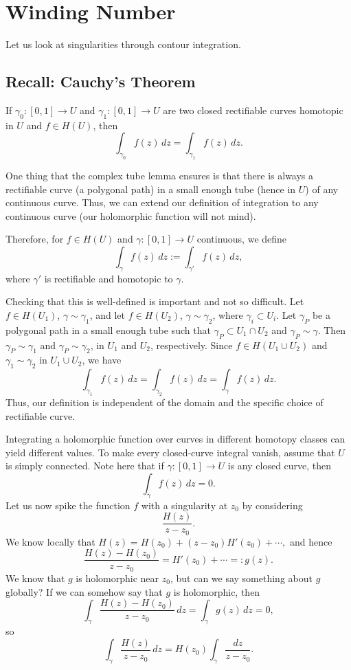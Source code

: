 \documentclass[11pt,a4paper]{article}
\begin{document}
\section*{Winding Number}
Let us look at singularities through contour integration.

\subsection*{Recall: Cauchy's Theorem}
If \(\gamma_0:[0,1]\to U\) and \(\gamma_1:[0,1]\to U\) are two closed rectifiable curves homotopic in $U$ and \(f\in H(U)\), then
\[
  \int_{\gamma_0} f(z)\,dz=\int_{\gamma_1} f(z)\,dz.
\]

One thing that the complex tube lemma ensures is that there is always a rectifiable curve (a polygonal path) in a small enough tube (hence in \(U\)) of any continuous curve. Thus, we can extend our definition of integration to any continuous curve (our holomorphic function will not mind).


Therefore, for \(f\in H(U)\) and \(\gamma:[0,1]\to U\) continuous, we define
\[
  \int_\gamma f(z)\,dz:=\int_{\gamma'} f(z)\,dz,
\]
where \(\gamma'\) is rectifiable and homotopic to \(\gamma\).

Checking that this is well-defined is important and not so difficult. Let \(f\in H(U_1)\), \(\gamma\sim\gamma_1\), and let \(f\in H(U_2)\), \(\gamma\sim\gamma_2\), where \(\gamma_i\subset U_i\). Let \(\gamma_P\) be a polygonal path in a small enough tube such that \(\gamma_P\subset U_1\cap U_2\) and \(\gamma_P\sim\gamma\). Then \(\gamma_P\sim\gamma_1\) and \(\gamma_P\sim\gamma_2\), in \(U_1\) and \(U_2\), respectively. Since \(f\in H(U_1\cup U_2)\) and \(\gamma_1\sim\gamma_2\) in \(U_1\cup U_2\), we have
\[
  \int_{\gamma_1} f(z)\,dz
  =\int_{\gamma_2} f(z)\,dz
  =\int_\gamma f(z)\,dz.
\]
Thus, our definition is independent of the domain and the specific choice of rectifiable curve.

Integrating a holomorphic function over curves in different homotopy classes can yield different values. To make every closed-curve integral vanish, assume that \(U\) is simply connected. Note here that if \(\gamma:[0,1]\to U\) is any closed curve, then
\[
  \int_\gamma f(z)\,dz=0.
\]
Let us now spike the function \(f\) with a singularity at \(z_0\) by considering
\[
  \frac{H(z)}{z-z_0}.
\]
We know locally that \(H(z)=H(z_0)+(z-z_0)H'(z_0)+\cdots,\)
and hence
\[
  \frac{H(z)-H(z_0)}{z-z_0}=H'(z_0)+\cdots=:g(z).
\]
We know that \(g\) is holomorphic near \(z_0\), but can we say something about \(g\) globally? If we can somehow say that \(g\) is holomorphic, then
\[
  \int_\gamma \frac{H(z)-H(z_0)}{z-z_0}\,dz
  =\int_\gamma g(z)\,dz=0,
\]
so
\[
  \int_\gamma \frac{H(z)}{z-z_0}\,dz
  =H(z_0)\int_\gamma \frac{dz}{z-z_0}.
\]
\end{document}
